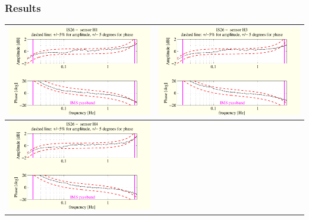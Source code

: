 \documentclass[handout,9pt]{beamer}
\begin{document}
\begin{frame}
\frametitle{Results}
\begin{tabular}{c||c}
\includegraphics[scale=0.35]{3monthsonIS26SUTboxplot1.pdf}
&
\includegraphics[scale=0.35]{3monthsonIS26SUTboxplot3.pdf}
\\
\hline\hline
\includegraphics[scale=0.35]{3monthsonIS26SUTboxplot4.pdf}

\end{tabular}
\end{frame}
\end{document}
